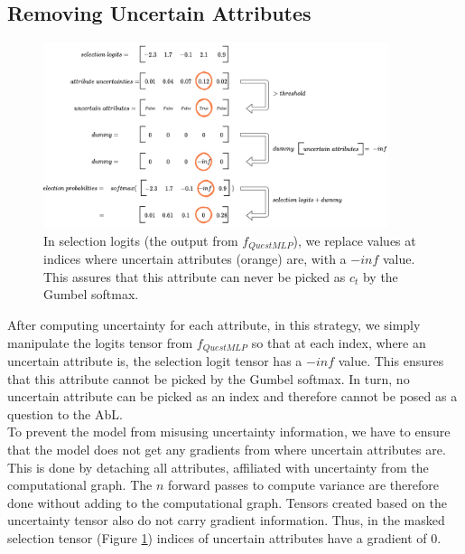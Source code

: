 \documentclass[a4paper,cleardoubleempty,BCOR1cm, 11pt]{report}
\begin{document}
\subsection{Removing Uncertain Attributes}\label{sec:remRDTC}
\begin{figure}
	\centering
	\includegraphics[width=0.9\textwidth]{images/remove_attrs.pdf} 
	\caption{In selection logits (the output from $f_{QuestMLP}$), we replace values at indices where uncertain attributes (orange) are, with a $-inf$ value. This assures that this attribute can never be picked as $c_t$ by the Gumbel softmax.}
	\label{fig:remove_intuition}
\end{figure}


After computing uncertainty for each attribute, in this strategy, we simply manipulate the logits tensor from $f_{QuestMLP}$ so that at each index, where an uncertain attribute is, the selection logit tensor has a $-inf$ value. This ensures that this attribute cannot be picked by the Gumbel softmax. In turn, no uncertain attribute can be picked as an index and therefore cannot be posed as a question to the AbL.\\
To prevent the model from misusing uncertainty information, we have to ensure that the model does not get any gradients from where uncertain attributes are. This is done by detaching all attributes, affiliated with uncertainty from the computational graph. The $n$ forward passes to compute variance are therefore done without adding to the computational graph. Tensors created based on the uncertainty tensor also do not carry gradient information. Thus, in the masked selection tensor (Figure \ref{fig:remove_intuition}) indices of uncertain attributes have a gradient of $0$.
\end{document}
